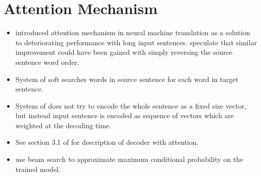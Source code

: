 \documentclass[12pt,a4paper,english
]{tutthesis}
\begin{document}
\section{Attention Mechanism}
\begin{itemize}
\item \cite{Bahdanau2014} introduced attention mechanism in neural machine translation as a solution to deteriorating performance with long input sentences. \cite{Sutskever2014} speculate that similar improvement could have been gained with simply reversing the source sentence word order.
\item System of \cite{Bahdanau2014} soft searches words in source sentence for each word in target sentence.
\item System of \cite{Bahdanau2014} does not try to encode the whole sentence as a fixed size vector, but instead input sentence is encoded as sequence of vectors which are weighted at the decoding time.
\item See section 3.1 of \cite{Bahdanau2014} for description of decoder with attention.
\item \cite{Bahdanau2014} use beam search to approximate maximum conditional probability on the trained model.
\end{itemize}
\end{document}
